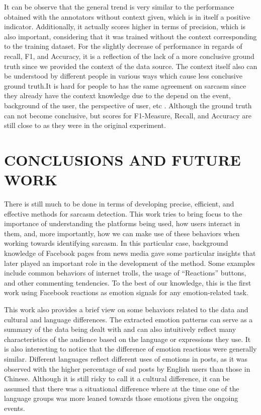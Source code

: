 \documentclass[12pt,a4paper]{report}
\theoremstyle{definition}
\begin{document}
\begin{CJK}{UTF8}{bsmi}
\begin{center}
\begin{figure}[H]
        \end{figure}
        \end{center}
        \par It can be observe that the general trend is very similar to the performance obtained with the annotators without context given, which is in itself a positive indicator.
        Additionally, it actually scores higher in terms of precision, which is also important, considering that it was trained without the context corresponding to the training dataset.
        For the slightly decrease of performance in regards of recall, F1, and Accuracy, it is a reflection of the lack of a more conclusive ground truth since we provided the context of the data source. The context itself also can be understood by different people in various ways which cause less conclusive ground truth.It is hard for people to has the same agreement on sarcasm since they already have the context knowledge due to the depend on the event, background of the user, the perspective of user, etc .
        Although the ground truth can not become conclusive, but scores for F1-Measure, Recall, and Accuracy are still close to as they were in the original experiment.
\chapter{CONCLUSIONS AND FUTURE WORK}
    \par There is still much to be done in terms of developing precise, efficient, and effective methods for sarcasm detection. This work tries to bring focus to the importance of understanding the platforms being used, how users interact in them, and, more importantly, how we can make use of these behaviors when working towards identifying sarcasm. In this particular case, background knowledge of Facebook pages from news media gave some particular insights that later played an important role in the development of the method. Some examples include common behaviors of internet trolls, the usage of “Reactions” buttons, and other commenting tendencies. To the best of our knowledge, this is the first work using Facebook reactions as emotion signals for any emotion-related task.
    
    \par This work also provides a brief view on some behaviors related to the data and cultural and language differences. The extracted emotion patterns can serve as a summary of the data being dealt with and can also intuitively reflect many characteristics of the audience based on the language or expressions they use. It is also interesting to notice that the difference of emotion reactions were generally similar. Different languages reflect different uses of emotions in posts, as it was observed with the higher percentage of sad posts by English users than those in Chinese. Although it is still risky to call it a cultural difference, it can be assumed that there was a situational difference where at the time one of the language groups was more leaned towards those emotions given the ongoing events.
    

\end{CJK}
\end{document}
